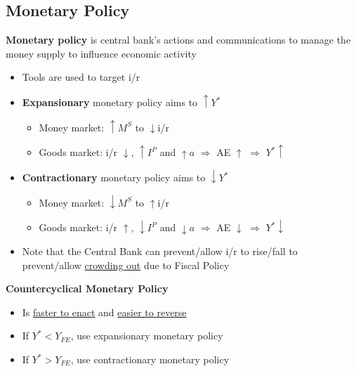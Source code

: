 \documentclass{article}
\begin{document}
\begin{multicols}{2}
\subsection{Monetary Policy}
\textbf{Monetary policy} is central bank's actions and communications to manage the money supply to influence economic activity
\begin{itemize}
	\item Tools are used to target i/r
	\item \textbf{Expansionary} monetary policy aims to $\uparrow Y^*$
	\begin{itemize}
		\item Money market: $\uparrow M^S$ to $\downarrow$i/r
		\item Goods market: i/r $\downarrow$, $\uparrow I^P$ and $\uparrow a$ $\Rightarrow$ AE $\uparrow$ $\Rightarrow$ $Y^*\uparrow$
	\end{itemize}
    \item \textbf{Contractionary} monetary policy aims to $\downarrow Y^*$
    \begin{itemize}
    	\item Money market: $\downarrow M^S$ to $\uparrow$i/r
    	\item Goods market: i/r $\uparrow$, $\downarrow I^P$ and $\downarrow a$ $\Rightarrow$ AE $\downarrow$ $\Rightarrow$ $Y^*\downarrow$
    \end{itemize}
    \item Note that the Central Bank can prevent/allow i/r to rise/fall to prevent/allow \underline{crowding out} due to Fiscal Policy
\end{itemize}
\textbf{Countercyclical Monetary Policy}
\begin{itemize}
	\item Is \underline{faster to enact} and \underline{easier to reverse}
	\item If $Y^* < Y_{FE}$, use expansionary monetary policy
	\item If $Y^* > Y_{FE}$, use contractionary monetary policy
\end{itemize}


\end{multicols}
\end{document}

